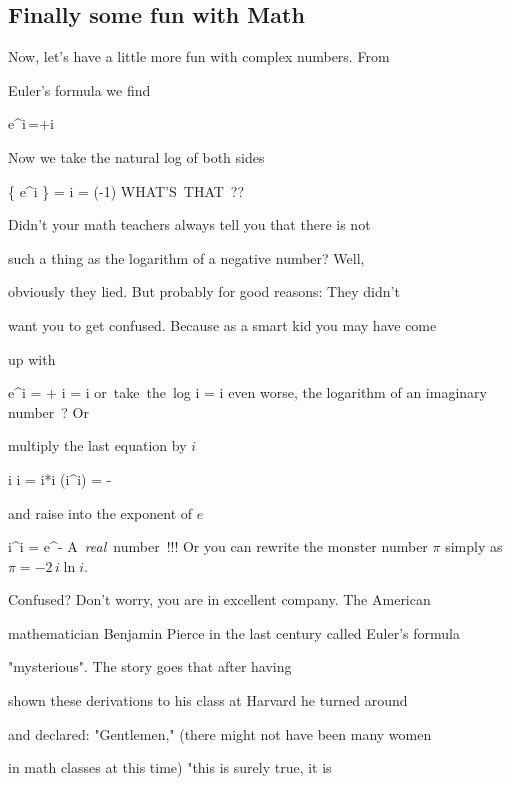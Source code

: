 \subsection{Finally some fun with Math}



Now, let's have a little more fun with complex numbers. From

Euler's formula we find

\bnn  e^{i\,\pi}=\cos\pi+i\,\sin{}  \enn

 Now we take the natural log of both sides

\bnn
   \ln \{ e^{i \pi} \} = i \pi = \ln(-1)  \qquad \mbox{WHAT'S THAT ??}
\enn

Didn't your math teachers always tell you that there is not

such a thing as the logarithm of a negative number? Well,

obviously they lied. But probably for good reasons: They didn't

want you to get confused. Because as a smart kid you may have come

up with

\bnn
  e^{i } = \cos{} + i \sin{} = i
       \quad \mbox{or take the log} \quad \ln i = i 
\enn even worse, the logarithm of an imaginary number~? Or

multiply the last equation by $i$

\bnn
    i \ln i = i*i  \quad \mbox \quad \ln(i^i) = -
\enn

 and raise into the exponent of $e$

\bnn
    i^i = e^{-}  \quad
          \mbox{A {\em real} number !!!}
\enn Or you can rewrite the monster number $\pi$ simply as $\pi=-2\,i \ln i$.



Confused? Don't worry, you are in excellent company. The American

mathematician Benjamin Pierce in the last century called Euler's formula

"mysterious". The story goes that after having

shown these derivations to his class at Harvard he turned around

and declared: "Gentlemen," (there might not have been many women

in math classes at this time) "this is surely true, it is


